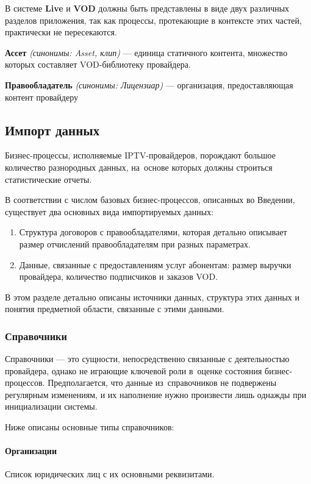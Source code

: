 В системе \textbf{Live} и \textbf{VOD} должны быть представлены в виде двух различных разделов приложения,
так как процессы, протекающие в контексте этих частей, практически не пересекаются.

\textbf{Ассет} \textit{(синонимы: Asset, клип)} --- единица статичного контента, множество которых составляет
VOD-библиотеку провайдера.

\textbf{Правообладатель} \textit{(синонимы: Лицензиар)} --- организация, предоставляющая контент провайдеру

\subsection{Импорт данных}
Бизнес-процессы, исполняемые IPTV-провайдеров, порождают большое количество разнородных данных, 
на~основе которых должны строиться статистические отчеты.

В соответствии с числом базовых бизнес-процессов, описанных во Введении, существует два
основных вида импортируемых данных:

\begin{enumerate}
\item{
Структура договоров с правообладателями, которая детально описывает размер 
отчислений правообладателям при разных параметрах.
}
\item{
Данные, связанные с предоставлениям услуг абонентам: размер выручки провайдера, количество подписчиков и заказов VOD. 
}
\end{enumerate}

В этом разделе детально описаны источники данных, структура этих данных и понятия предметной области,
связанные с этими данными.

\subsubsection{Справочники}
Справочники --- это сущности, непосредственно связанные с деятельностью провайдера, однако не играющие ключевой роли
в~оценке состояния бизнес-процессов. Предполагается, что данные из~справочников не подвержены регулярным изменениям,
и их наполнение нужно произвести лишь однажды при инициализации системы.

Ниже описаны основные типы справочников:
\paragraph{Организации}
Список юридических лиц с их основными реквизитами. 

